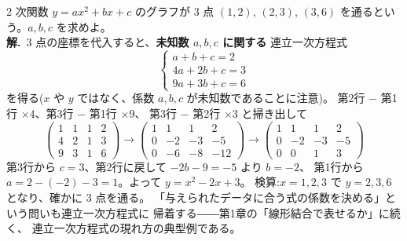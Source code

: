 \begin{rei}[例題・標準(データのあてはめ)]\label{rei:gauss-fit}
$2$ 次関数 $y = ax^2 + bx + c$ のグラフが $3$ 点 $(1, 2)$, $(2, 3)$, $(3, 6)$
を通るという。$a, b, c$ を求めよ。\\
\textbf{解.}\ $3$ 点の座標を代入すると、\textbf{未知数 $a, b, c$ に関する}
連立一次方程式
\[
\begin{cases}
a + b + c = 2 \\
4a + 2b + c = 3 \\
9a + 3b + c = 6
\end{cases}
\]
を得る($x$ や $y$ ではなく、係数 $a, b, c$ が未知数であることに注意)。
第2行 $-$ 第1行 $\times 4$、第3行 $-$ 第1行 $\times 9$、
第3行 $-$ 第2行 $\times 3$ と掃き出して
\[
\left(\begin{array}{ccc|c}
1 & 1 & 1 & 2 \\
4 & 2 & 1 & 3 \\
9 & 3 & 1 & 6
\end{array}\right)
\longrightarrow
\left(\begin{array}{ccc|c}
1 & 1 & 1 & 2 \\
0 & -2 & -3 & -5 \\
0 & -6 & -8 & -12
\end{array}\right)
\longrightarrow
\left(\begin{array}{ccc|c}
1 & 1 & 1 & 2 \\
0 & -2 & -3 & -5 \\
0 & 0 & 1 & 3
\end{array}\right)
\]
第3行から $c = 3$、第2行に戻して $-2b - 9 = -5$ より $b = -2$、
第1行から $a = 2 - (-2) - 3 = 1$。よって $y = x^2 - 2x + 3$。
検算:$x = 1, 2, 3$ で $y = 2, 3, 6$ となり、確かに $3$ 点を通る。
「与えられたデータに合う式の係数を決める」という問いも連立一次方程式に
帰着する――第1章の「線形結合で表せるか」に続く、
連立一次方程式の現れ方の典型例である。
\end{rei}

